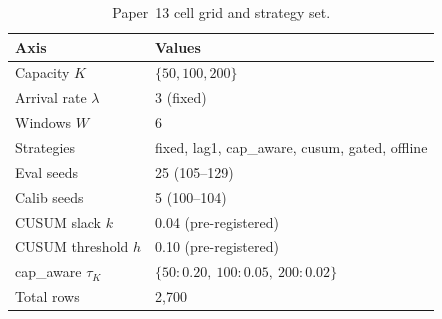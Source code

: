 \begin{table}[!t]
  \caption{Paper~13 cell grid and strategy set.}
  \label{tab:grid}
  \centering
  \small
  \setlength{\tabcolsep}{4pt}
  \begin{tabular}{@{}p{2.6cm}p{4.9cm}@{}}
    \toprule
    \textbf{Axis} & \textbf{Values} \\
    \midrule
    Capacity $K$ & $\{50, 100, 200\}$ \\
    Arrival rate $\lambda$ & 3 (fixed) \\
    Windows $W$ & 6 \\
    Strategies & fixed, lag1, cap\_aware, cusum, gated, offline \\
    Eval seeds & 25 (105--129) \\
    Calib seeds & 5 (100--104) \\
    CUSUM slack $k$ & 0.04 (pre-registered) \\
    CUSUM threshold $h$ & 0.10 (pre-registered) \\
    cap\_aware $\tau_K$ & $\{50{:}0.20,\ 100{:}0.05,\ 200{:}0.02\}$ \\
    \midrule
    Total rows & 2{,}700 \\
    \bottomrule
  \end{tabular}
\end{table}
